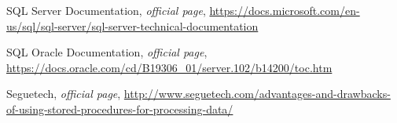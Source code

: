 \begin{thebibliography}{99999}
\singlespace\normalsize

 SQL Server Documentation, \textit{ official page}, \url{https://docs.microsoft.com/en-us/sql/sql-server/sql-server-technical-documentation}

 SQL Oracle Documentation, \textit{ official page}, \url{https://docs.oracle.com/cd/B19306_01/server.102/b14200/toc.htm}

 Seguetech, \textit{ official page}, \url{http://www.seguetech.com/advantages-and-drawbacks-of-using-stored-procedures-for-processing-data/}

\end{thebibliography}
